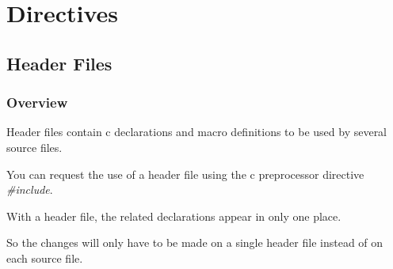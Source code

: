 \documentclass[9pt]{beamer}
\newcommand{\nl}[0]{\vspace{0.4cm}}
\begin{document}
%
%

\section{Directives}

%
%

\subsection{Header Files}


\begin{frame}
  \frametitle{Overview}

  Header files contain c declarations and macro definitions to be used
  by several source files.

  \nl

  You can request the use of a header file using the c preprocessor
  directive \textit{\#include}.

  \nl

  With a header file, the related declarations appear in only one place.

  \nl

  So the changes will only have to be made on a single header file
  instead of on each source file.
\end{frame}

\end{document}
